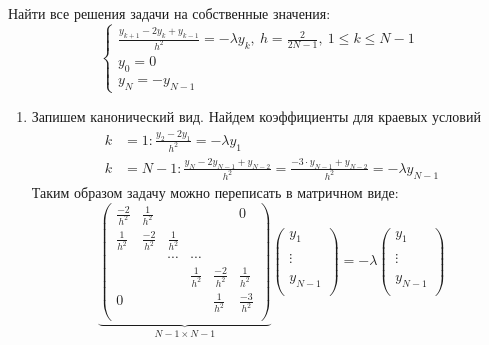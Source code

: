 \begin{task}
  Найти все решения задачи на собственные значения:
  \[\begin{cases}
      \frac{y_{k+1}-2y_k+y_{k-1}}{h^2} = -\lambda y_k,\ h = \frac{2}{2N-1},\ 1 \leq k \leq N-1 \\
      y_0 = 0                                                                                  \\
      y_N = -y_{N-1}
    \end{cases}\]
  \begin{enumerate}
    \item Запишем канонический вид. Найдем коэффициенты для краевых условий
          \begin{align*}
            k & = 1: \frac{y_2 - 2y_1}{h^2} = -\lambda y_1                                                             \\
            k & = N-1: \frac{y_{N} - 2y_{N-1}+y_{N-2}}{h^2} = \frac{-3\cdot y_{N-1} + y_{N-2}}{h^2} = -\lambda y_{N-1}
          \end{align*}
          Таким образом задачу можно переписать в матричном виде:
          \[\underbrace{\left(\begin{array}{cccccc}
                \frac{-2}{h^2} & \frac{1}{h^2}  &               &               &                & 0              \\
                \frac{1}{h^2}  & \frac{-2}{h^2} & \frac{1}{h^2} &               &                &                \\
                               &                & \cdots        & \cdots        &                &                \\
                               &                &               & \frac{1}{h^2} & \frac{-2}{h^2} & \frac{1}{h^2}  \\
                0              &                &               &               & \frac{1}{h^2}  & \frac{-3}{h^2} \\
              \end{array}\right)}_{N-1\times N-1}
            \left(\begin{array}{c}
                y_{1}   \\
                \\
                \vdots  \\
                \\
                y_{N-1} \\
              \end{array}\right)
            =
            -\lambda
            \left(\begin{array}{c}
                y_{1}   \\
                \\
                \vdots  \\
                \\
                y_{N-1} \\
              \end{array}\right)
          \]


\end{enumerate}
\end{task}
